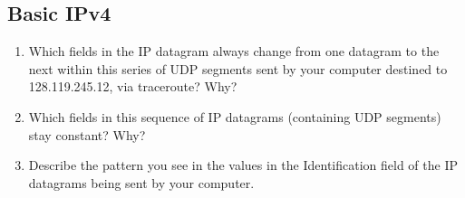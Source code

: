 \subsection{Basic IPv4}
\begin{enumerate}[label=\bfseries Problem \arabic*:,leftmargin=*,labelindent=1em]
\addtocounter{enumi}{5}
        \item Which fields in the IP datagram always change from one datagram to the next within this series of UDP segments sent by your computer destined to 128.119.245.12, via traceroute? Why?\\[0.2mm]
        \soln
        \item Which fields in this sequence of IP datagrams (containing UDP segments) stay constant? Why?\\[0.2mm]
        \soln
        \item Describe the pattern you see in the values in the Identification field of the IP datagrams being sent by your computer.\\[0.2mm]
        \soln
\end{enumerate}
\newpage